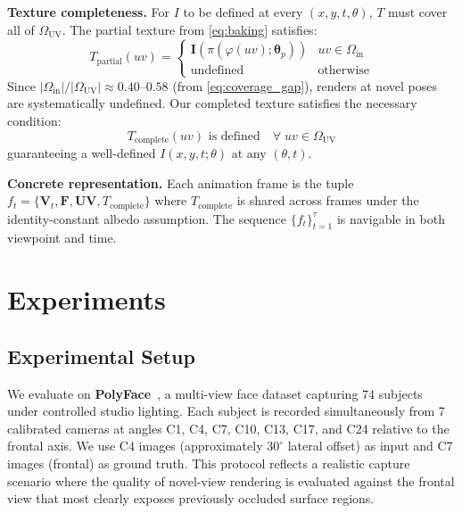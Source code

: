 \documentclass[conference]{IEEEtran}
\newcommand{\OUV}{\Omega_{\text{UV}}}
\newcommand{\Oin}{\Omega_{\text{in}}}
\newcommand{\Tpartial}{T_{\text{partial}}}
\newcommand{\Tcomplete}{T_{\text{complete}}}
\begin{document}
\medskip\noindent\textbf{Texture completeness.}
For $I$ to be defined at every $(x,y,t,\theta)$, $T$ must cover all of $\OUV$.
The partial texture from \eqref{eq:baking} satisfies:
\begin{equation}
  \Tpartial(uv) = \begin{cases}
    \mathbf{I}(\pi(\varphi(uv);\bm{\theta}_p)) & uv \in \Oin \\
    \text{undefined} & \text{otherwise}
  \end{cases}
  \label{eq:T_partial_def}
\end{equation}
Since $|\Oin|/|\OUV| \approx 0.40$--$0.58$ (from \eqref{eq:coverage_gap}),
renders at novel poses are systematically undefined. Our completed texture
satisfies the necessary condition:
\begin{equation}
  \Tcomplete(uv) \text{ is defined} \quad \forall\; uv \in \OUV
  \label{eq:T_complete_cond}
\end{equation}
guaranteeing a well-defined $I(x,y,t;\theta)$ at any $(\theta, t)$.

\medskip\noindent\textbf{Concrete representation.}
Each animation frame is the tuple
$f_t = \{\mathbf{V}_t, \mathbf{F}, \mathbf{UV}, \Tcomplete\}$
where $\Tcomplete$ is shared across frames under the identity-constant albedo
assumption. The sequence $\{f_t\}_{t=1}^{\tau}$ is navigable in both viewpoint
and time.

\section{Experiments}
\label{sec:exp}

\subsection{Experimental Setup}

We evaluate on \textbf{PolyFace}~\cite{polyface}, a multi-view face dataset
capturing 74 subjects under controlled studio lighting. Each subject is recorded
simultaneously from 7 calibrated cameras at angles C1, C4, C7, C10, C13, C17,
and C24 relative to the frontal axis. We use C4 images (approximately
$30^{\circ}$ lateral offset) as input and C7 images (frontal) as ground truth.
This protocol reflects a realistic capture scenario where the quality of
novel-view rendering is evaluated against the frontal view that most clearly
exposes previously occluded surface regions.
\end{document}
